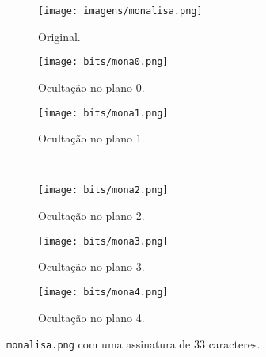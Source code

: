 \begin{figure}[H]
    \centering
    \begin{subfigure}{0.33\textwidth}
        \centering
        \texttt{[image: imagens/monalisa.png]}
        \caption{Original.}
    \end{subfigure}%
    \begin{subfigure}{0.33\textwidth}
        \centering
        \texttt{[image: bits/mona0.png]}
        \caption{Ocultação no plano 0.}
    \end{subfigure}
    \begin{subfigure}{0.33\textwidth}
        \centering
        \texttt{[image: bits/mona1.png]}
        \caption{Ocultação no plano 1.}
    \end{subfigure}\\[8pt]
    \begin{subfigure}{0.33\textwidth}
        \centering
        \texttt{[image: bits/mona2.png]}
        \caption{Ocultação no plano 2.}
    \end{subfigure}%
    \begin{subfigure}{0.33\textwidth}
        \centering
        \texttt{[image: bits/mona3.png]}
        \caption{Ocultação no plano 3.}
    \end{subfigure}%
    \begin{subfigure}{0.33\textwidth}
        \centering
        \texttt{[image: bits/mona4.png]}
        \caption{Ocultação no plano 4.}
    \end{subfigure}

    \caption{\texttt{monalisa.png} com uma assinatura de 33 caracteres.}
    \label{fig:monalisa}
\end{figure}